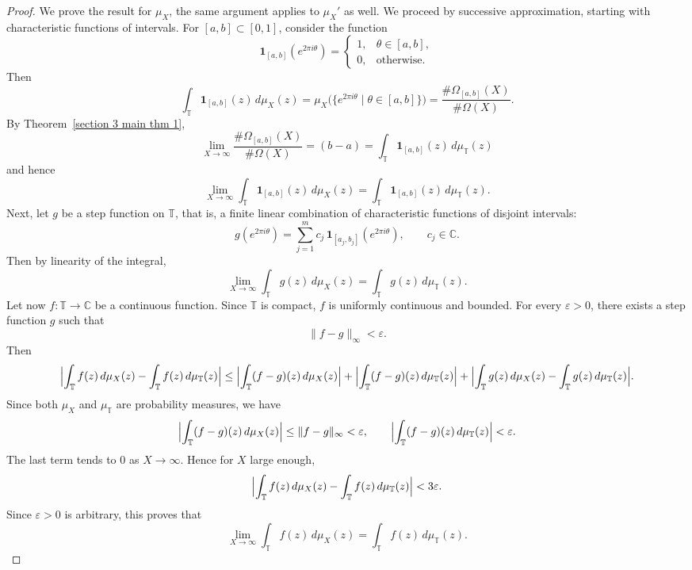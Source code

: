 \documentclass[table]{amsart}
\numberwithin{equation}{section}
\begin{document}
\begin{proof}
\par We prove the result for $\mu_X$, the same argument applies to $\mu_X'$ as well. We proceed by successive approximation, starting with characteristic functions of intervals. For $[a,b]\subset [0,1]$, consider the function
\[
\mathbf{1}_{[a,b]}(e^{2\pi i\theta})
= \begin{cases}
1, & \theta\in[a,b],\\
0, & \text{otherwise.}
\end{cases}
\]
Then
\[
\int_{\mathbb{T}}\mathbf{1}_{[a,b]}(z)\,d\mu_X(z)
= \mu_X\big(\{e^{2\pi i\theta}\mid \theta\in[a,b]\}\big)
= \frac{\#\Omega_{[a,b]}(X)}{\#\Omega(X)}.
\]
By Theorem~\ref{section 3 main thm 1}, 
\[
\lim_{X\rightarrow \infty}\frac{\#\Omega_{[a,b]}(X)}{\#\Omega(X)}=(b-a)=\int_{\mathbb{T}}\mathbf{1}_{[a,b]}(z)\,d\mu_{\mathbb{T}}(z)
\]
and hence
\[
\lim_{X\rightarrow \infty}\int_{\mathbb{T}}\mathbf{1}_{[a,b]}(z)\,d\mu_X(z)
= \int_{\mathbb{T}} \mathbf{1}_{[a,b]}(z)\,d\mu_{\mathbb{T}}(z).
\]
Next, let $g$ be a step function on $\mathbb{T}$, that is, a finite linear combination of characteristic functions of disjoint intervals:
\[
g(e^{2\pi i\theta}) = \sum_{j=1}^m c_j\,\mathbf{1}_{[a_j,b_j]}(e^{2\pi i\theta}),
\qquad c_j\in\mathbb{C}.
\]
Then by linearity of the integral,
\[
\lim_{X\rightarrow \infty}\int_{\mathbb{T}}g(z)\,d\mu_X(z)
= \int_{\mathbb{T}} g(z)\,d\mu_{\mathbb{T}}(z).
\]
Let now $f:\mathbb{T}\to\mathbb{C}$ be a continuous function. Since $\mathbb{T}$ is compact, $f$ is uniformly continuous and bounded. For every $\varepsilon>0$, there exists a step function $g$ such that
\[
\|f-g\|_\infty < \varepsilon.
\]
Then
\[
\Bigl|\int_{\mathbb{T}} f(z)\,d\mu_X(z)
- \int_{\mathbb{T}} f(z)\,d\mu_{\mathbb{T}}(z)\Bigr|
\le
\Bigl|\int_{\mathbb{T}} (f-g)(z)\,d\mu_X(z)\Bigr|
+ \Bigl|\int_{\mathbb{T}} (f-g)(z)\,d\mu_{\mathbb{T}}(z)\Bigr|
+ \Bigl|\int_{\mathbb{T}} g(z)\,d\mu_X(z)
- \int_{\mathbb{T}} g(z)\,d\mu_{\mathbb{T}}(z)\Bigr|.
\]
Since both $\mu_X$ and $\mu_{\mathbb{T}}$ are probability measures, we have
\[
\Bigl|\int_{\mathbb{T}} (f-g)(z)\,d\mu_X(z)\Bigr|
\le \|f-g\|_\infty < \varepsilon,
\qquad
\Bigl|\int_{\mathbb{T}} (f-g)(z)\,d\mu_{\mathbb{T}}(z)\Bigr| < \varepsilon.
\]
The last term tends to $0$ as $X\to\infty$. Hence for $X$ large enough,
\[
\Bigl|\int_{\mathbb{T}} f(z)\,d\mu_X(z)
- \int_{\mathbb{T}} f(z)\,d\mu_{\mathbb{T}}(z)\Bigr| < 3\varepsilon.
\]
Since $\varepsilon>0$ is arbitrary, this proves that
\[
\lim_{X\rightarrow \infty}\int_{\mathbb{T}} f(z)\,d\mu_X(z)
= \int_{\mathbb{T}} f(z)\,d\mu_{\mathbb{T}}(z).
\]
\end{proof}
\end{document}
